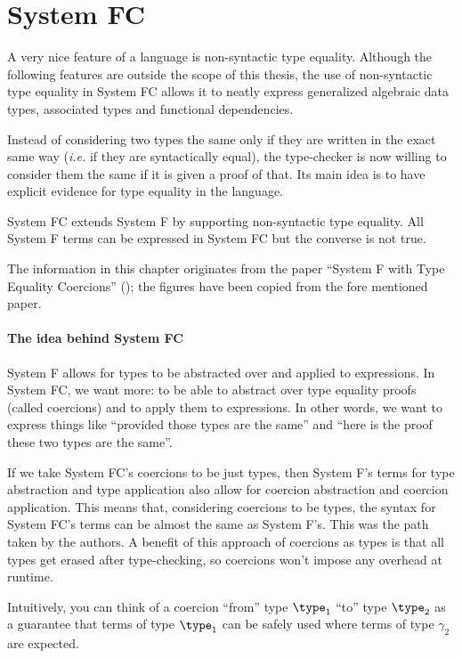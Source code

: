 \chapter{System FC}
\label{cha:3}

A very nice feature of a language is non-syntactic type equality. Although the following features are outside the scope of this thesis, the use of non-syntactic type equality in System FC allows it to neatly express generalized algebraic data types, associated types and functional dependencies.

Instead of considering two types the same only if they are written in the exact same way (\textit{i.e.} if they are syntactically equal), the type-checker is now willing to consider them the same if it is given a proof of that. Its main idea is to have explicit evidence for type equality in the language.

System FC extends System F by supporting non-syntactic type equality. All System F terms can be expressed in System FC but the converse is not true. 

The information in this chapter originates from the paper ``System F with Type Equality Coercions'' (\cite{fcpaper}); the figures have been copied from the fore mentioned paper.

\subsubsection{The idea behind System FC}
System F allows for types to be abstracted over and applied to expressions. In System FC, we want more: to be able to abstract over type equality proofs (called  coercions) and to apply them to expressions. In other words, we want to express things like ``provided those types are the same'' and ``here is the proof these two types are the same''.

If we take System FC's coercions to be just types, then System F's terms for type abstraction and type application also allow for coercion abstraction and coercion application. This means that, considering coercions to be types, the syntax for System FC's terms can be almost the same as System F's. This was the path taken by the authors. A benefit of this approach of coercions as types is that all types get erased after type-checking, so coercions won't impose any overhead at runtime.

Intuitively, you can think of a coercion ``from'' type $\type_1$ ``to'' type $\type_2$ as a guarantee that terms of type $\type_1$ can be safely used where terms of type $\gamma_2$ are expected. 

